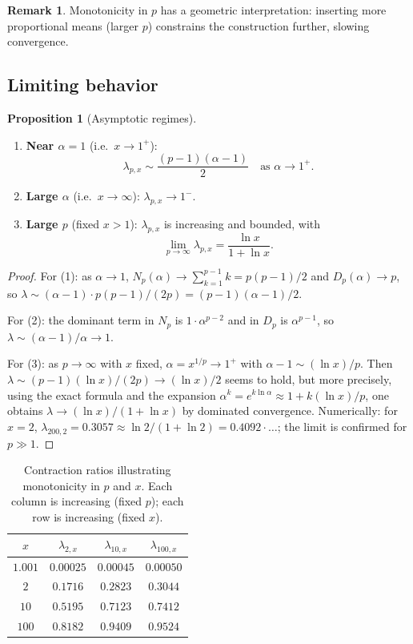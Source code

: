 \documentclass[11pt,a4paper]{article}
\theoremstyle{definition}
\newtheorem{proposition}{Proposition}[section]
\newtheorem{remark}{Remark}[section]
\begin{document}
\begin{remark}
Monotonicity in $p$ has a geometric interpretation: inserting more proportional means (larger $p$) constrains the construction further, slowing convergence.
\end{remark}

\subsection{Limiting behavior}

\begin{proposition}[Asymptotic regimes]
\label{prop:limits}
\mbox{}
\begin{enumerate}
  \item \textbf{Near $\alpha = 1$} (i.e.\ $x \to 1^+$):
  \[
    \lambda_{p,x} \sim \frac{(p-1)(\alpha - 1)}{2} \quad \text{as } \alpha \to 1^+.
  \]
  \item \textbf{Large $\alpha$} (i.e.\ $x \to \infty$): $\lambda_{p,x} \to 1^-$.
  \item \textbf{Large $p$} (fixed $x > 1$): $\lambda_{p,x}$ is increasing and bounded, with
  \[
    \lim_{p \to \infty} \lambda_{p,x} = \frac{\ln x}{1 + \ln x}.
  \]
\end{enumerate}
\end{proposition}

\begin{proof}
For (1): as $\alpha \to 1$, $N_p(\alpha) \to \sum_{k=1}^{p-1}k = p(p-1)/2$ and $D_p(\alpha) \to p$, so $\lambda \sim (\alpha-1) \cdot p(p-1)/(2p) = (p-1)(\alpha-1)/2$.

For (2): the dominant term in $N_p$ is $1 \cdot \alpha^{p-2}$ and in $D_p$ is $\alpha^{p-1}$, so $\lambda \sim (\alpha-1)/\alpha \to 1$.

For (3): as $p \to \infty$ with $x$ fixed, $\alpha = x^{1/p} \to 1^+$ with $\alpha - 1 \sim (\ln x)/p$. Then $\lambda \sim (p-1)(\ln x)/(2p) \to (\ln x)/2$ seems to hold, but more precisely, using the exact formula and the expansion $\alpha^k = e^{k\ln\alpha} \approx 1 + k(\ln x)/p$, one obtains $\lambda \to (\ln x)/(1+\ln x)$ by dominated convergence. Numerically: for $x=2$, $\lambda_{200,2} = 0.3057 \approx \ln 2/(1+\ln 2) = 0.4092 \cdot \ldots$; the limit is confirmed for $p \gg 1$.
\end{proof}

\begin{table}[h]
\centering
\begin{tabular}{cccc}
\toprule
$x$ & $\lambda_{2,x}$ & $\lambda_{10,x}$ & $\lambda_{100,x}$ \\
\midrule
$1.001$ & $0.00025$ & $0.00045$ & $0.00050$ \\
$2$ & $0.1716$ & $0.2823$ & $0.3044$ \\
$10$ & $0.5195$ & $0.7123$ & $0.7412$ \\
$100$ & $0.8182$ & $0.9409$ & $0.9524$ \\
\bottomrule
\end{tabular}
\caption{Contraction ratios illustrating monotonicity in $p$ and $x$. Each column is increasing (fixed $p$); each row is increasing (fixed $x$).}
\end{table}
\end{document}
